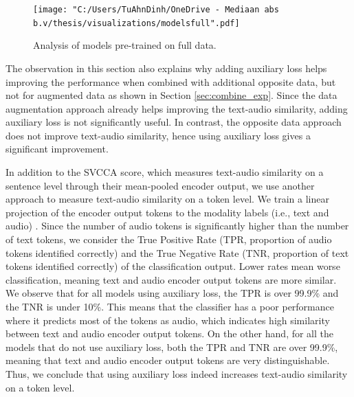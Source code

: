 \documentclass[conference]{IEEEtran}
\begin{document}
	\begin{figure}[htbp]
		\centerline{\texttt{[image: "C:/Users/TuAhnDinh/OneDrive - Mediaan abs b.v/thesis/visualizations/modelsfull".pdf]}}
		\caption{Analysis of models pre-trained on full data.}
		\label{fig:modelsfull}
	\end{figure}
	
	
	The observation in this section also explains why adding auxiliary loss helps improving the performance when combined with additional opposite data, but not for augmented data as shown in Section \ref{sec:combine_exp}. Since the data augmentation approach already helps improving the text-audio similarity, adding auxiliary loss is not significantly useful. In contrast, the opposite data approach does not improve text-audio similarity, hence using auxiliary loss gives a significant improvement.
	
	In addition to the SVCCA score, which measures text-audio similarity on a sentence level through their mean-pooled encoder output, we use another approach to measure text-audio similarity on a token level. We train a linear projection of the encoder output tokens to the modality labels (i.e., text and audio) \cite{DEPI}. Since the number of audio tokens is significantly higher than the number of text tokens, we consider the True Positive Rate (TPR, proportion of audio tokens identified correctly) and the True Negative Rate (TNR, proportion of text tokens identified correctly) of the classification output. Lower rates mean worse classification, meaning text and audio encoder output tokens are more similar. We observe that for all models using auxiliary loss, the TPR is over 99.9\% and the TNR is under 10\%. This means that the classifier has a poor performance where it predicts most of the tokens as audio, which indicates high similarity between text and audio encoder output tokens. On the other hand, for all the models that do not use auxiliary loss, both the TPR and TNR are over 99.9\%, meaning that text and audio encoder output tokens are very distinguishable. Thus, we conclude that using auxiliary loss indeed increases text-audio similarity on a token level.
	
\end{document}
